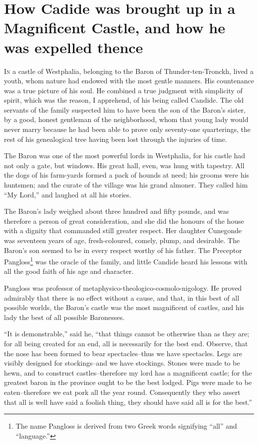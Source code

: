 \chapter{How Cadide was brought up in a Magnificent Castle, and how he was expelled thence}
\thispagestyle{pter}
\lettrine[lraise=0.1,nindent=0em,slope=-.5em]{I}{n} a castle of Westphalia, belonging to the Baron of Thunder-ten-Tronckh, lived a youth, whom nature had endowed with the most gentle manners. His countenance was a true picture of his soul. He 
combined a true judgment with simplicity of spirit, which was the reason, I apprehend, of his being called Candide. The old servants of the family suspected him to have been the son of the Baron's sister, by a good, honest gentleman of the neighborhood, whom that young lady would never marry because he had been able to prove only seventy-one quarterings, the rest of his genealogical tree having been lost through the injuries of time.

The Baron was one of the most powerful lords in Westphalia, for his castle had not only a gate, but windows. His great hall, even, was hung with tapestry. All the dogs of his farm-yards formed a pack of hounds at need; his grooms were his huntsmen; and the curate of the village was his grand almoner. They called him ``My Lord,'' and laughed at all his stories.

The Baron's lady weighed about three hundred and fifty pounds, and was therefore a person of great consideration, and she did the honours of the house with a dignity that commanded still greater respect. Her daughter Cunegonde was seventeen years of age, fresh-coloured, comely, plump, and desirable. The Baron's son seemed to be in every respect worthy of his father. The Preceptor Pangloss\footnote{The name Pangloss is derived from two Greek words signifying ``all'' and ``language.''} was the oracle of the family, and little Candide heard his lessons with all the good faith of his age and character.

Pangloss was professor of metaphysico-theologico-cosmolo-nigology. He proved admirably that there is no effect without a cause, and that, in this best of all possible worlds, the Baron's castle was the most magnificent of castles, and his lady the best of all possible Baronesses.

``It is demonstrable,'' said he, ``that things cannot be otherwise than as they are; for all being created for an end, all is necessarily for the best end. Observe, that the nose has been formed to bear spectacles--thus we have spectacles. Legs are visibly designed for stockings--and we have stockings. Stones were made to be hewn, and to construct castles--therefore my lord has a magnificent castle; for the greatest baron in the province ought to be the best lodged. Pigs were made to be eaten--therefore we eat pork all the year round. Consequently they who assert that all is well have said a foolish thing, they should have said all is for the best.''

